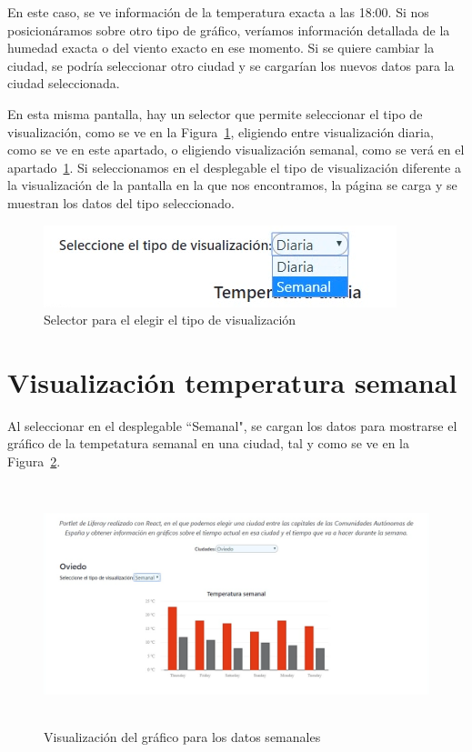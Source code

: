 \documentclass[a4paper, 12pt]{book}
\begin{document}
En este caso, se ve información de la temperatura exacta a las 18:00. Si nos posicionáramos sobre otro tipo de gráfico, veríamos información detallada de la humedad exacta o del viento exacto en ese momento.
Si se quiere cambiar la ciudad, se podría seleccionar otro ciudad y se cargarían los nuevos datos para la ciudad seleccionada.

\vspace{5mm}
En esta misma pantalla, hay un selector que permite seleccionar el tipo de visualización, como se ve en la Figura~\ref{fig:seleccion_tipo}, eligiendo entre visualización diaria, como se ve en este apartado, o eligiendo visualización semanal, como se verá en el apartado~\ref{sec:visualizacion-semanal}.
Si seleccionamos en el desplegable el tipo de visualización diferente a la visualización de la pantalla en la que nos encontramos, la página se carga y se muestran los datos del tipo seleccionado.
\begin{figure}[h]
  \centering
  \includegraphics{img_usadas/seleccion_tipo.png}
  \caption{Selector para el elegir el tipo de visualización}
  \label{fig:seleccion_tipo}
\end{figure}


\section{Visualización temperatura semanal}
\label{sec:visualizacion-semanal}
Al seleccionar en el desplegable ``Semanal", se cargan los datos para mostrarse el gráfico de la tempetatura semanal en una ciudad, tal y como se ve en la Figura~\ref{fig:pantalla_semanal}.
\begin{figure}[h]
  \centering
  \includegraphics[width=13cm, height=7cm]{img_usadas/pantalla_semanal.png}
  \caption{Visualización del gráfico para los datos semanales}
  \label{fig:pantalla_semanal}
\end{figure}
\end{document}
